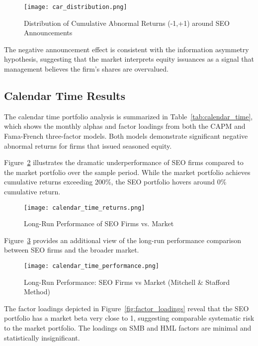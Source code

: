 \documentclass[12pt]{article}
\begin{document}
\begin{figure}[H]
\centering
\texttt{[image: car\_distribution.png]}
\caption{Distribution of Cumulative Abnormal Returns (-1,+1) around SEO Announcements}
\label{fig:car_dist}
\end{figure}

The negative announcement effect is consistent with the information asymmetry hypothesis, suggesting that the market interprets equity issuances as a signal that management believes the firm's shares are overvalued.

\subsection{Calendar Time Results}

The calendar time portfolio analysis is summarized in Table~\ref{tab:calendar_time}, which shows the monthly alphas and factor loadings from both the CAPM and Fama-French three-factor models. Both models demonstrate significant negative abnormal returns for firms that issued seasoned equity.



Figure~\ref{fig:calendar_time} illustrates the dramatic underperformance of SEO firms compared to the market portfolio over the sample period. While the market portfolio achieves cumulative returns exceeding 200\%, the SEO portfolio hovers around 0\% cumulative return.

\begin{figure}[H]
\centering
\texttt{[image: calendar\_time\_returns.png]}
\caption{Long-Run Performance of SEO Firms vs. Market}
\label{fig:calendar_time}
\end{figure}

Figure~\ref{fig:calendar_performance} provides an additional view of the long-run performance comparison between SEO firms and the broader market.

\begin{figure}[H]
\centering
\texttt{[image: calendar\_time\_performance.png]}
\caption{Long-Run Performance: SEO Firms vs Market (Mitchell \& Stafford Method)}
\label{fig:calendar_performance}
\end{figure}

The factor loadings depicted in Figure~\ref{fig:factor_loadings} reveal that the SEO portfolio has a market beta very close to 1, suggesting comparable systematic risk to the market portfolio. The loadings on SMB and HML factors are minimal and statistically insignificant.
\end{document}
